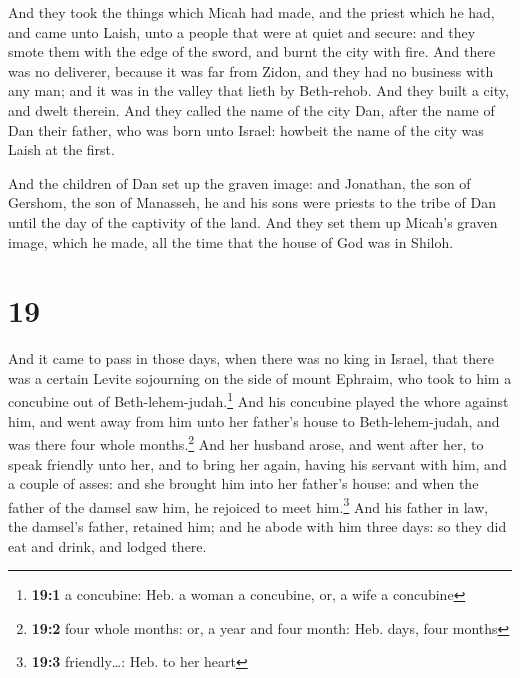  And they took the things which Micah had made, and the
priest which he had, and came unto Laish, unto a people that were at
quiet and secure: and they smote them with the edge of the sword, and
burnt the city with fire.  And there was no deliverer,
because it was far from Zidon, and they had no business with any man;
and it was in the valley that lieth by Beth-rehob. And they built a
city, and dwelt therein.  And they called the name of the
city Dan, after the name of Dan their father, who was born unto Israel:
howbeit the name of the city was Laish at the first.

 And the children of Dan set up the graven image: and
Jonathan, the son of Gershom, the son of Manasseh, he and his sons were
priests to the tribe of Dan until the day of the captivity of the land.
 And they set them up Micah's graven image, which he
made, all the time that the house of God was in Shiloh.

\hypertarget{section-18}{%
\section{19}\label{section-18}}

 And it came to pass in those days, when there was no king
in Israel, that there was a certain Levite sojourning on the side of
mount Ephraim, who took to him a concubine out of
Beth-lehem-judah.\footnote{\textbf{19:1} a concubine: Heb. a woman a
  concubine, or, a wife a concubine}  And his concubine
played the whore against him, and went away from him unto her father's
house to Beth-lehem-judah, and was there four whole months.\footnote{\textbf{19:2}
  four whole months: or, a year and four month: Heb. days, four months}
 And her husband arose, and went after her, to speak
friendly unto her, and to bring her again, having his servant with him,
and a couple of asses: and she brought him into her father's house: and
when the father of the damsel saw him, he rejoiced to meet
him.\footnote{\textbf{19:3} friendly\ldots: Heb. to her heart}
 And his father in law, the damsel's father, retained him;
and he abode with him three days: so they did eat and drink, and lodged
there.

